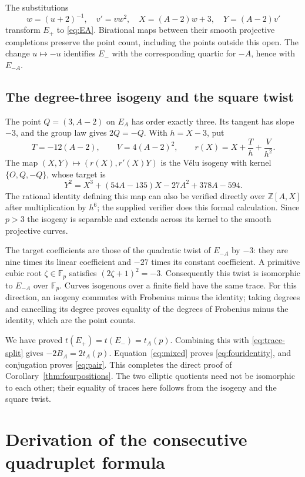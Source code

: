 \documentclass[11pt]{article}
\theoremstyle{definition}\newtheorem{definition}[theorem]{Definition}
\newcommand{\Fp}{\mathbb F_p}
\newcommand{\Z}{\mathbb Z}
\begin{document}
The substitutions
\[
 w=(u+2)^{-1},\quad v'=vw^2,\quad
 X=(A-2)w+3,\quad Y=(A-2)v'
\]
transform $E_+$ to \eqref{eq:EA}.
Birational maps between their smooth projective completions
preserve the point count, including the points outside this open.
The change $u\mapsto-u$ identifies $E_-$ with the corresponding
quartic for $-A$, hence with $E_{-A}$.

\subsection{The degree-three isogeny and the square twist}
The point $Q=(3,A-2)$ on $E_A$ has order exactly three.
Its tangent has slope $-3$, and the group law gives $2Q=-Q$.
With $h=X-3$, put
\[
 T=-12(A-2),\qquad V=4(A-2)^2,\qquad
 r(X)=X+\frac{T}{h}+\frac{V}{h^2}.
\]
The map $(X,Y)\mapsto(r(X),r'(X)Y)$ is the
V\'elu isogeny with kernel $\{O,Q,-Q\}$, whose target is
\begin{equation}\label{eq:velu-target}
 Y^2=X^3+(54A-135)X-27A^2+378A-594.
\end{equation}
The rational identity defining this map can also be verified
directly over $\Z[A,X]$ after multiplication by $h^6$;
the supplied verifier does this formal calculation.
Since $p>3$ the isogeny is separable and extends across its
kernel to the smooth projective curves.

The target coefficients are those of the quadratic twist of
$E_{-A}$ by $-3$: they are nine times its linear coefficient
and $-27$ times its constant coefficient. A primitive cubic
root $\zeta\in\Fp$ satisfies $(2\zeta+1)^2=-3$.
Consequently this twist is isomorphic to $E_{-A}$ over $\Fp$.
Curves isogenous over a finite field have the same trace.
For this direction, an isogeny commutes with Frobenius minus
the identity; taking degrees and cancelling its degree proves
equality of the degrees of Frobenius minus the identity,
which are the point counts.

We have proved $t(E_+)=t(E_-)=t_A(p)$.
Combining this with \eqref{eq:trace-split} gives
$-2B_A=2t_A(p)$. Equation~\eqref{eq:mixed} proves
\eqref{eq:fouridentity}, and conjugation proves \eqref{eq:pair}.
This completes the direct proof of Corollary~\ref{thm:fourpositions}.
The two elliptic quotients need not be isomorphic to each other;
their equality of traces here follows from the isogeny and the
square twist.

\section{Derivation of the consecutive quadruplet formula}
\end{document}
